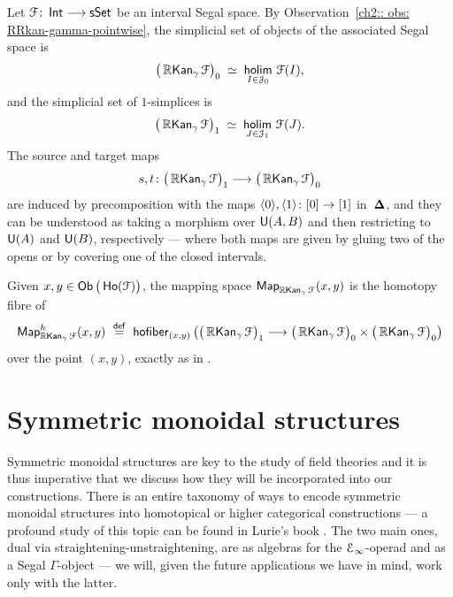\begin{remark}\label{ch2:: rem: objects-morphisms-as-holims}
Let \(\mathcal F\colon \operatorname{\mathsf{Int}} \longrightarrow \operatorname{\sf sSet}\) be an interval Segal space.
By Observation~\ref{ch2:: obs: RRkan-gamma-pointwise}, the simplicial set
of objects of the associated Segal space is
\begin{equation}
  \big(\Rrkan_{\gamma}\cF\big)_0
  \;\simeq\;
  \hoLimit[I \in \cJ_0] \cF(I),
\end{equation}
and the simplicial set of \(1\)-simplices is
\begin{equation}
  \big(\Rrkan_{\gamma}\cF\big)_1
  \;\simeq\;
  \hoLimit[J \in \cJ_1] \cF(J).
\end{equation}
The source and target maps
\begin{equation}
  s,t \colon
  \big(\operatorname{\mathbb{R}\mathsf{Kan}}_{\gamma}\mathcal F\big)_1 \longrightarrow
  \big(\operatorname{\mathbb{R}\mathsf{Kan}}_{\gamma}\mathcal F\big)_0
\end{equation}
are induced by precomposition with the maps
\(\langle 0\rangle,\langle 1\rangle \colon [0]\rightarrow [1]\) in~\(\mathbf\Delta\), and they can be understood as taking a morphism over $\mathsf U(A,B)$ and then restricting to $\mathsf U(A)$ and $\mathsf U(B)$, respectively — where both maps are given by gluing two of the opens or by covering one of the closed intervals. 


\nid Given \(x,y \in \operatorname{{\sf Ob}}\big(\operatorname{\sf Ho}(\mathcal F)\big)\), the mapping space
\(\operatorname{{\sf Map}}_{\operatorname{\mathbb{R}\mathsf{Kan}}_{\gamma}\mathcal F}(x,y)\) is the homotopy fibre of
\begin{equation}
  \operatorname{{\sf Map}}^{h}_{\operatorname{\mathbb{R}\mathsf{Kan}}_{\gamma}\mathcal F}(x,y) \,\, \overset{\sf def}{=}\,\, \mathsf{hofiber}_{(x,y)}\left(
  \big(\operatorname{\mathbb{R}\mathsf{Kan}}_{\gamma}\mathcal F\big)_1 \longrightarrow
  \big(\operatorname{\mathbb{R}\mathsf{Kan}}_{\gamma}\mathcal F\big)_0 \times
  \big(\operatorname{\mathbb{R}\mathsf{Kan}}_{\gamma}\mathcal F\big)_0\right)
\end{equation}
over the point \((x,y)\), exactly as in .
\end{remark}




\section{Symmetric monoidal structures}
\label{ch2:: sec: symmetric monoidal structure}

Symmetric monoidal structures are key to the study of field theories and it is thus imperative that we discuss how they will be incorporated into our constructions. There is an entire taxonomy of ways to encode symmetric monoidal structures into homotopical or higher categorical constructions — a profound study of this topic can be found in Lurie's book \cite{LurieHA}. The two main ones, dual via straightening-unstraightening, are as algebras for the $\mathcal E_{\operatorname{\infty}}$-operad and as a Segal $\Gamma$-object — we will, given the future applications we have in mind, work only with the latter. 

